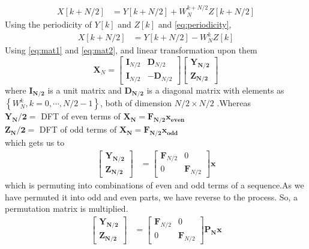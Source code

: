 \documentclass[journal,12pt,twocolumn]{IEEEtran}
\providecommand{\cbrak}[1]{\ensuremath{\left\{#1\right\}}}
\providecommand{\sbrak}[1]{\ensuremath{\left[#1\right]}}
\let\vec\mathbf
\numberwithin{equation}{section}
\renewcommand\thesection{\arabic{section}}
\begin{document}
\begin{enumerate}[label=\arabic*.,ref=\thesection.\theenumi]
 \begin{align}
 X\sbrak{k+N/2}&=Y\sbrak{k+N/2}+W_N^{k+N/2} Z\sbrak{k+N/2}
 \end{align}
 Using the periodicity of $Y\sbrak{k}$ and $Z\sbrak{k}$ and \eqref{eq:periodicity},
 \begin{align}
 \label{eq:mat2}
 X\sbrak{k+N/2}&=Y\sbrak{k+N/2}-W_N^{k} Z\sbrak{k}
 \end{align}
 Using \eqref{eq:mat1} and \eqref{eq:mat2}, and linear transformation upon them
 \begin{equation}
 \label{eq:fmat}
\vec{X}_{N}=
\begin{bmatrix}
\vec{I}_{N/2} & \vec{D}_{N/2} \\
\vec{I}_{N/2} & -\vec{D}_{N/2}
\end{bmatrix}
\begin{bmatrix}
\vec{Y_{N/2}}\\\vec{Z_{N/2}}
\end{bmatrix}
\end{equation}
where $\vec{I_{N/2}}$ is a unit matrix and $\vec{D_{N/2}}$ is a diagonal matrix with elements as $\cbrak{W_N^{k},k=0,\cdots,N/2-1}$, both of dimension $N/2 \times N/2$ .Whereas \\
$\vec{Y_N/2}=$ DFT of even terms of $\vec{X_N}=\vec{F_{N/2}x_{even}}$\\
$\vec{Z_N/2}=$ DFT of odd terms of $\vec{X_N}=\vec{F_{N/2}x_{odd}}$\\
which gets us to \\
\begin{align}
\begin{bmatrix}
\vec{Y_{N/2}}\\\vec{Z_{N/2}}
\end{bmatrix}&=
\begin{bmatrix}
\vec{F}_{N/2} & 0 \\
0 & \vec{F}_{N/2}
\end{bmatrix}\vec{x}
\end{align}
which is permuting into combinations of even and odd terms of a sequence.As we have permuted it into odd and even parts, we have reverse to the process. So, a permutation matrix is multiplied.
\begin{align}
\begin{bmatrix}
\vec{Y_{N/2}}\\\vec{Z_{N/2}}
\end{bmatrix}&=
\begin{bmatrix}
\vec{F}_{N/2} & 0 \\
0 & \vec{F}_{N/2}
\end{bmatrix}\vec{P_N}\vec{x}

\end{align}
\end{enumerate}
\end{document}
